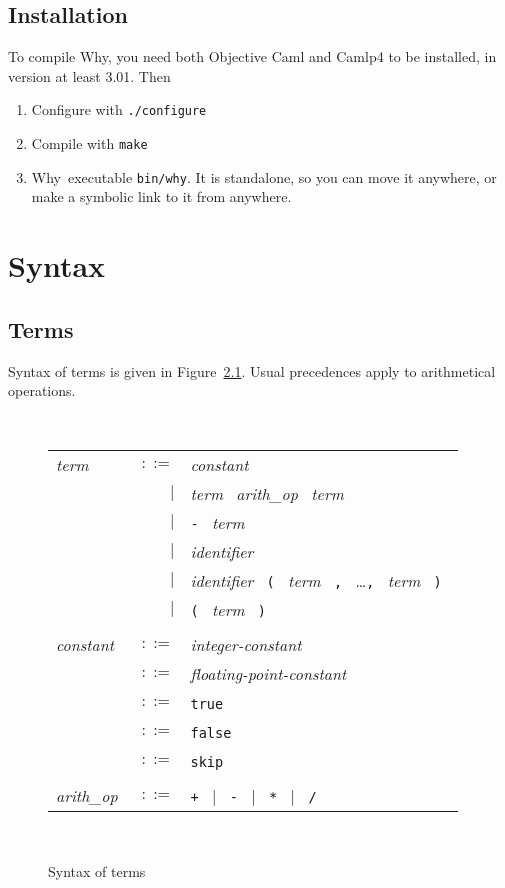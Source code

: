 \documentclass[12pt]{report}
\newcommand{\why}{\textsf{Why}}
\newcommand{\te}[1]{\texttt{#1}~}
\newcommand{\nt}[1]{\textsl{#1}~}
\begin{document}
\section{Installation}

To compile \why, you need both \textsf{Objective Caml} and
\textsf{Camlp4} to be installed, in version at least 3.01.
Then 

\begin{enumerate}
\item Configure with \texttt{./configure}
\item Compile with \texttt{make}
\item \why\ executable \texttt{bin/why}. It is standalone, 
  so you can move it anywhere, or make a symbolic link to it from anywhere.
\end{enumerate}


\chapter{Syntax}
\label{syntax}

\section{Terms}

Syntax of terms is given in Figure~\ref{fig:terms}.
Usual precedences apply to arithmetical operations.

\begin{figure}[htbp]
\begin{center}
\hrulefill\\
\begin{tabular}{lrl}
  \nt{term}
    & $::=$ & \nt{constant} \\
      & $|$ & \nt{term} \nt{arith\_op} \nt{term} \\
      & $|$ & \te{-} \nt{term} \\
      & $|$ & \nt{identifier} \\
      & $|$ & \nt{identifier} 
              \te{(} \nt{term} \te{,} \dots \te{,} \nt{term} \te{)} \\
      & $|$ & \te{(} \nt{term} \te{)} \\
  \\[0.1em]

  \nt{constant}
    & $::=$ & \nt{integer-constant} \\
    & $::=$ & \nt{floating-point-constant} \\
    & $::=$ & \te{true} \\
    & $::=$ & \te{false} \\
    & $::=$ & \te{skip} \\
  \\[0.1em]

  \nt{arith\_op}
    & $::=$ & \te{+} $|$~ \te{-} $|$~ \te{*} $|$~ \te{/}
\end{tabular}\\
\hrulefill
\caption{Syntax of terms}
\label{fig:terms}
\end{center}		
\end{figure}
\end{document}
